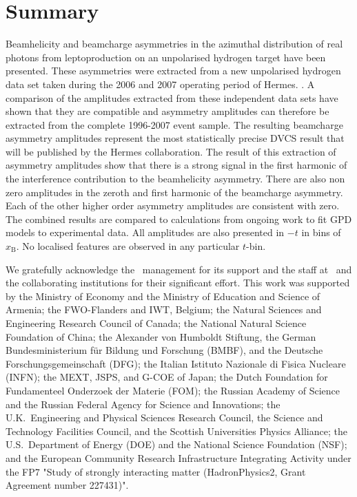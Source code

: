 \section{Summary}

Beam\blue{-}helicity and beam\blue{-}charge asymmetries in the azimuthal distribution of real photons from leptoproduction on an unpolarised hydrogen target have been presented. These asymmetries were extracted from a new unpolarised hydrogen data set taken during the 2006 and 2007 operating period of H{\sc ermes}. . A comparison of the amplitudes extracted from these independent data sets have shown that they are compatible and asymmetry amplitudes can therefore be extracted from the complete 1996-2007 event sample. The resulting beam\blue{-}charge asymmetry amplitudes represent the most statistically precise DVCS result that will be published by the H{\sc ermes} collaboration. The result of this extraction of asymmetry amplitudes show that there is a strong signal in the first harmonic of the interference contribution to the beam\blue{-}helicity asymmetry. There are also non zero amplitudes in the zeroth and first harmonic of the beam\blue{-}charge asymmetry. Each of the other higher order asymmetry amplitudes are consistent with zero. The combined results are compared to calculations from ongoing work to fit GPD models to experimental data. All  amplitudes are also presented  in $-t$ in bins of $x_{\textrm{B}}$. No localised features are observed in any particular $t$-bin.

\acknowledgments
We gratefully acknowledge the \desy\ management for its support and the staff
at \desy\ and the collaborating institutions for their significant effort.
This work was supported by 
the Ministry of Economy and the Ministry of Education and Science of Armenia;
the FWO-Flanders and IWT, Belgium;
the Natural Sciences and Engineering Research Council of Canada;
the National Natural Science Foundation of China;
the Alexander von Humboldt Stiftung,
the German Bundesministerium f\"ur Bildung und Forschung (BMBF), and
the Deutsche Forschungsgemeinschaft (DFG);
the Italian Istituto Nazionale di Fisica Nucleare (INFN);
the MEXT, JSPS, and G-COE of Japan;
the Dutch Foundation for Fundamenteel Onderzoek der Materie (FOM);
the Russian Academy of Science and the Russian Federal Agency for 
Science and Innovations;
the U.K.~Engineering and Physical Sciences Research Council, 
the Science and Technology Facilities Council,
and the Scottish Universities Physics Alliance;
the U.S.~Department of Energy (DOE) and the National Science Foundation (NSF);
and the European Community Research Infrastructure Integrating Activity
under the FP7 "Study of strongly interacting matter (HadronPhysics2, Grant
Agreement number 227431)".

